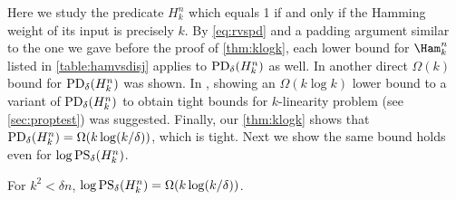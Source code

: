 Here we study the predicate $H^n_k$ which equals 1 if 
and only if the Hamming weight of its input is precisely $k$. 
By \autoref{eq:rvspd} and a padding argument similar to the 
one we gave before the proof of \autoref{thm:klogk}, each lower 
bound for $\Ham^n_k$ listed in \autoref{table:hamvsdisj} applies 
to $\mathrm{PD}_\delta(H^n_k)$ as well. In \cite{BlaisK2012} another 
direct $\Omega(k)$ bound for $\mathrm{PD}_\delta(H^n_k)$ was shown. In 
\cite{BhrushundiCK2014}, showing an $\Omega(k\log k)$ lower bound 
to a variant of $\mathrm{PD}_\delta(H^n_k)$ to obtain tight bounds for 
$k$-linearity problem (see \autoref{sec:proptest}) was suggested. 
Finally, our \autoref{thm:klogk} shows that 
$\mathrm{PD}_\delta(H^n_k)=\Omega(k\log(k/\delta))$, which is tight. 
Next we show the same bound holds even for $\log \mathrm{PS}_\delta(H^n_k)$.

\begingroup
\def\thetheorem{\ref{thm:paritysize}}
\begin{theorem}[restated]
For $k^2<\delta n$, 
$\log \mathrm{PS}_\delta(H^n_k)=\Omega(k\log(k/\delta))$.
\end{theorem}
\addtocounter{theorem}{-1}
\endgroup
